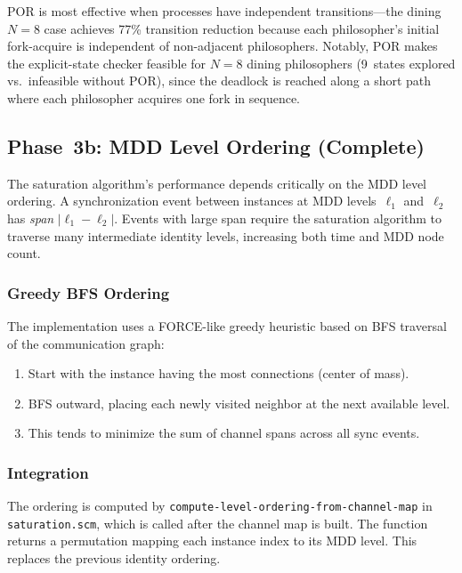 \documentclass[11pt]{article}
\begin{document}
POR is most effective when processes have independent transitions---the
dining $N{=}8$ case achieves 77\% transition reduction because each
philosopher's initial fork-acquire is independent of non-adjacent
philosophers.  Notably, POR makes the explicit-state checker feasible
for $N{=}8$ dining philosophers (9~states explored vs.\ infeasible
without POR), since the deadlock is reached along a short path where
each philosopher acquires one fork in sequence.

\subsection{Phase~3b: MDD Level Ordering (Complete)}

The saturation algorithm's performance depends critically on the MDD
level ordering.  A synchronization event between instances at MDD
levels~$\ell_1$ and~$\ell_2$ has \emph{span} $|\ell_1 - \ell_2|$.
Events with large span require the saturation algorithm to traverse
many intermediate identity levels, increasing both time and MDD node
count.

\subsubsection{Greedy BFS Ordering}

The implementation uses a FORCE-like greedy heuristic based on BFS
traversal of the communication graph:
\begin{enumerate}
\item Start with the instance having the most connections (center of
  mass).
\item BFS outward, placing each newly visited neighbor at the next
  available level.
\item This tends to minimize the sum of channel spans across all sync
  events.
\end{enumerate}

\subsubsection{Integration}

The ordering is computed by \texttt{compute-level-ordering-from-channel-map}
in \texttt{saturation.scm}, which is called after the channel map is
built.  The function returns a permutation mapping each instance index
to its MDD level.  This replaces the previous identity ordering.
\end{document}
